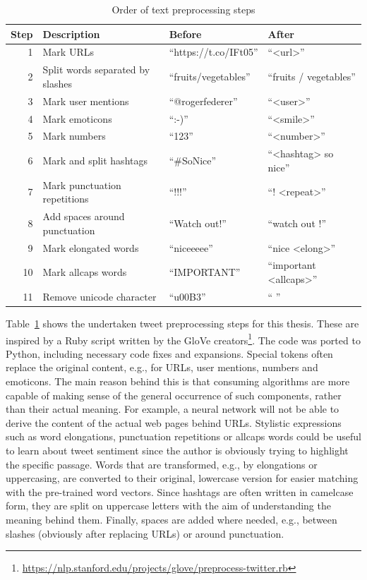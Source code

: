 \begin{table}
\begin{tabular}{rlll}
\toprule
Step & Description & Before & After \\
\midrule
1 & Mark URLs & ``https://t.co/IFt05'' & ``<url>'' \\
2 & Split words separated by slashes & ``fruits/vegetables'' & ``fruits / vegetables'' \\
3 & Mark user mentions & ``@rogerfederer'' & ``<user>'' \\
4 & Mark emoticons & ``:-)'' & ``<smile>'' \\
5 & Mark numbers & ``123'' & ``<number>'' \\
6 & Mark and split hashtags & ``\#SoNice'' & ``<hashtag> so nice'' \\
7 & Mark punctuation repetitions & ``!!!'' & ``! <repeat>'' \\
8 & Add spaces around punctuation & ``Watch out!'' & ``watch out !'' \\
9 & Mark elongated words & ``niceeeee'' & ``nice <elong>'' \\
10 & Mark allcaps words & ``IMPORTANT'' & ``important <allcaps>'' \\
11 & Remove unicode character & ``u00B3'' & `` '' \\
\bottomrule
\end{tabular}
\caption{Order of text preprocessing steps}
\label{tab:text_preprocessing}
\end{table}

Table~\ref{tab:text_preprocessing} shows the undertaken tweet preprocessing
steps for this thesis.
These are inspired by a Ruby script written by the GloVe creators\footnote{\url{https://nlp.stanford.edu/projects/glove/preprocess-twitter.rb}}.
The code was ported to Python, including necessary code fixes and expansions.
Special tokens often replace the original content, e.g., for URLs, user mentions,
numbers and emoticons.
The main reason behind this is that consuming algorithms are more capable of
making sense of the general occurrence of such components, rather than their
actual meaning.
For example, a neural network will not be able to derive the content of the
actual web pages behind URLs.
Stylistic expressions such as word elongations, punctuation repetitions or
allcaps words could be useful to learn about tweet sentiment since the author is 
obviously trying to highlight the specific passage.
Words that are transformed, e.g., by elongations or uppercasing, are converted to their original, lowercase
version for easier matching with the pre-trained word vectors.
Since hashtags are often written in camelcase form, they are split on uppercase
letters with the aim of understanding the meaning behind them.
Finally, spaces are added where needed, e.g., between slashes (obviously after
replacing URLs) or around punctuation.

